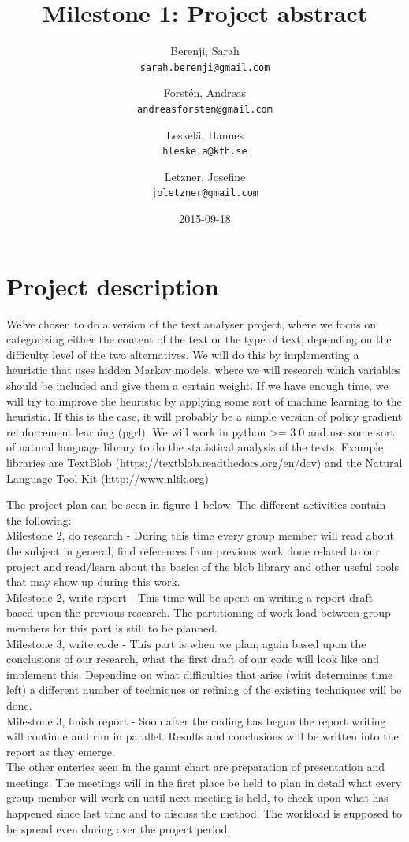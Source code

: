 \documentclass[a4paper]{article}
\title{Milestone 1: Project abstract}
\author{
  Berenji, Sarah\\
  \texttt{sarah.berenji@gmail.com}
  \and
  Forstén, Andreas\\
  \texttt{andreasforsten@gmail.com}
  \and
  Leskelä, Hannes\\
  \texttt{hleskela@kth.se}
  \and
  Letzner, Josefine\\
    \texttt{joletzner@gmail.com}
}
\date{2015-09-18}
\begin{document}
\maketitle
\section*{{Project description}}

We've chosen to do a version of the text analyser project, where we focus on categorizing either the content of the text or the type of text, depending on the difficulty level of the two alternatives. We will do this by implementing a heuristic that uses hidden Markov models, where we will research which variables should be included and give them a certain weight. If we have enough time, we will try to improve the heuristic by applying some sort of machine learning to the heuristic. If this is the case, it will probably be a simple version of policy gradient reinforcement learning (pgrl). We will work in python >= 3.0 and use some sort of natural language library to do the statistical analysis of the texts. Example libraries are TextBlob (https://textblob.readthedocs.org/en/dev) and the Natural Language Tool Kit (http://www.nltk.org)
\newline

\noindent The project plan can be seen in figure 1 below. The different activities contain the following:\\
Milestone 2, do research - During this time every group member will read about the subject in general, find references from previous work done related to our project and read/learn about the basics of the blob library and other useful tools that may show up during this work.\\
Milestone 2, write report - This time will be spent on writing a report draft based upon the previous research. The partitioning of work load between group members for this part is still to be planned.\\
Milestone 3, write code - This part is when we plan, again based upon the conclusions of our research, what the first draft of our code will look like and implement this. Depending on what difficulties that arise (whit determines time left) a different number of techniques or refining of the existing techniques will be done. \\
Milestone 3, finish report - Soon after the coding has begun the report writing will continue and run in parallel. Results and conclusions will be written into the report as they emerge.\\
The other enteries seen in the gannt chart are preparation of presentation and meetings. The meetings will in the first place be held to plan in detail what every group member will work on until next meeting is held, to check upon what has happened since last time and to discuss the method. The workload is supposed to be spread even during over the project period.
  
\end{document}
